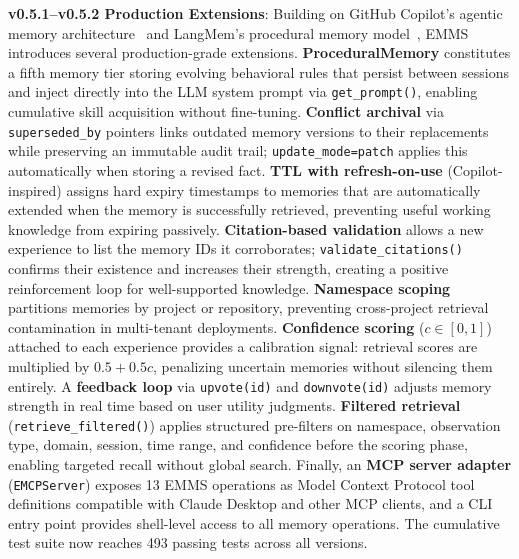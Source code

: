 \documentclass[conference]{IEEEtran}
\begin{document}
\textbf{v0.5.1--v0.5.2 Production Extensions}: Building on GitHub Copilot's agentic memory architecture~\cite{githubcopilot2025} and LangMem's procedural memory model~\cite{langmem2025}, EMMS introduces several production-grade extensions. \textbf{ProceduralMemory} constitutes a fifth memory tier storing evolving behavioral rules that persist between sessions and inject directly into the LLM system prompt via \texttt{get\_prompt()}, enabling cumulative skill acquisition without fine-tuning. \textbf{Conflict archival} via \texttt{superseded\_by} pointers links outdated memory versions to their replacements while preserving an immutable audit trail; \texttt{update\_mode=\textquotedbl patch\textquotedbl} applies this automatically when storing a revised fact. \textbf{TTL with refresh-on-use} (Copilot-inspired) assigns hard expiry timestamps to memories that are automatically extended when the memory is successfully retrieved, preventing useful working knowledge from expiring passively. \textbf{Citation-based validation} allows a new experience to list the memory IDs it corroborates; \texttt{validate\_citations()} confirms their existence and increases their strength, creating a positive reinforcement loop for well-supported knowledge. \textbf{Namespace scoping} partitions memories by project or repository, preventing cross-project retrieval contamination in multi-tenant deployments. \textbf{Confidence scoring} ($c \in [0,1]$) attached to each experience provides a calibration signal: retrieval scores are multiplied by $0.5 + 0.5c$, penalizing uncertain memories without silencing them entirely. A \textbf{feedback loop} via \texttt{upvote(id)} and \texttt{downvote(id)} adjusts memory strength in real time based on user utility judgments. \textbf{Filtered retrieval} (\texttt{retrieve\_filtered()}) applies structured pre-filters on namespace, observation type, domain, session, time range, and confidence before the scoring phase, enabling targeted recall without global search. Finally, an \textbf{MCP server adapter} (\texttt{EMCPServer}) exposes 13 EMMS operations as Model Context Protocol tool definitions compatible with Claude Desktop and other MCP clients, and a CLI entry point provides shell-level access to all memory operations. The cumulative test suite now reaches 493 passing tests across all versions.
\end{document}
